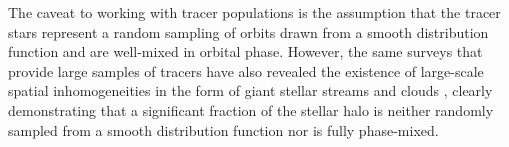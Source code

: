 \documentclass{emulateapj}
\begin{document}
The caveat to working with tracer populations is the assumption that the tracer stars represent a random sampling of orbits drawn from a smooth distribution function and are well-mixed in orbital phase. However, the same surveys that provide large samples of tracers have also revealed the existence of large-scale spatial inhomogeneities in the form of giant stellar streams and clouds \citep{newberg02,majewski03,belokurov06}, clearly demonstrating that a significant fraction of the stellar halo is neither randomly sampled from a smooth distribution function nor is fully phase-mixed.
\end{document}
